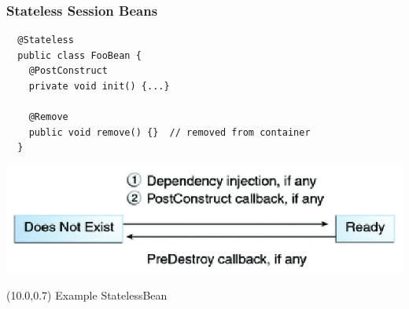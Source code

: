 \documentclass[10pt,xcolor=pdflatex]{beamer}
\begin{document}
\begin{frame}[fragile]\frametitle{Stateless Session Beans}
  \begin{verbatim}
  @Stateless
  public class FooBean {
    @PostConstruct
    private void init() {...}

    @Remove
    public void remove() {}  // removed from container
  }
  \end{verbatim}
  \includegraphics[scale=0.6]{img/obr1}
\begin{textblock}{10}(10.0,0.7)
    {\footnotesize Example StatelessBean}
\end{textblock}
\end{frame}
\end{document}
